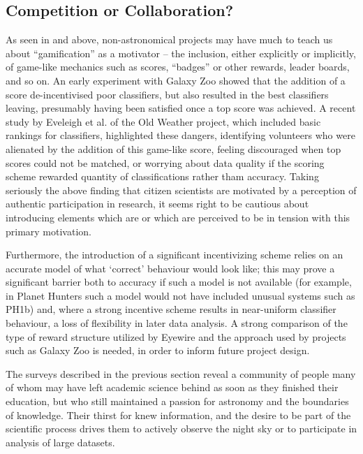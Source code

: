 \documentclass{ar2e}
\begin{document}

\subsection{Competition or Collaboration?}
\label{sec:crowd:gamification}


As seen in  and  
above, non-astronomical projects may have
much to teach us about ``gamification'' as a motivator -- the inclusion, either
explicitly or implicitly, of game-like mechanics such as scores, ``badges'' or
other rewards, leader boards, and so on. An early experiment with Galaxy Zoo
showed that the addition of a score de-incentivised poor classifiers, but also
resulted in the best classifiers leaving, presumably having been satisfied once
a top score was achieved. A recent study by Eveleigh et al. of the Old Weather
project, which included basic rankings for classifiers, highlighted these
dangers, identifying volunteers who were alienated by the addition of this
game-like score, feeling discouraged when top scores could not be matched, or
worrying about data quality if the scoring scheme rewarded quantity of
classifications rather tham accuracy. Taking seriously the above finding 
that citizen scientists are motivated by a perception of authentic
participation in research, it seems right to be cautious about introducing
elements which are or which are perceived to be in tension with this primary
motivation. 

Furthermore, the introduction of a significant incentivizing scheme relies on an
accurate model of what `correct' behaviour would look like; this may prove a
significant barrier both to accuracy if such a model is not available (for
example, in Planet Hunters such a model would not have included unusual systems
such as PH1b) and, where a strong incentive scheme results in near-uniform
classifier behaviour, a loss of flexibility in later data analysis. 
A strong comparison of the type of reward structure utilized by Eyewire and the
approach used by projects such as Galaxy Zoo is needed, in order to
inform future project design. 

The surveys described in the previous section reveal a community of people many
of whom may have left   academic science behind as soon as they finished their 
education, but who still maintained a passion for astronomy and the  boundaries
of knowledge.  Their thirst for knew information, and the  desire to be part of
the  scientific process drives them to actively observe the  night sky or to
participate in analysis of large datasets.  
\end{document}
